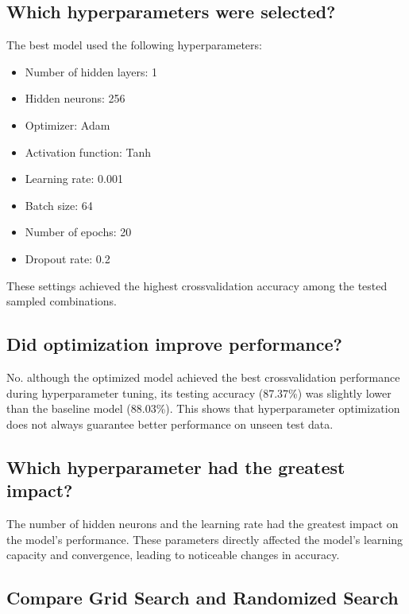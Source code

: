 \documentclass[11pt]{article}
\begin{document}
\subsection{Which hyperparameters were selected?}

The best model used the following hyperparameters:

\begin{itemize}
    \item Number of hidden layers: 1
    \item Hidden neurons: 256
    \item Optimizer: Adam
    \item Activation function: Tanh
    \item Learning rate: 0.001
    \item Batch size: 64
    \item Number of epochs: 20
    \item Dropout rate: 0.2
\end{itemize}

These settings achieved the highest crossvalidation accuracy among the tested sampled combinations.

\subsection{Did optimization improve performance?}

No. although the optimized model achieved the best crossvalidation performance during 
hyperparameter tuning, its testing accuracy (87.37\%) was slightly lower than the baseline 
model (88.03\%). This shows that hyperparameter optimization does not always guarantee 
better performance on unseen test data.

\subsection{Which hyperparameter had the greatest impact?}

The number of hidden neurons and the learning rate had the greatest impact on the model's 
performance. These parameters directly affected the model's learning capacity and 
convergence, leading to noticeable changes in accuracy.
\subsection{Compare Grid Search and Randomized Search}
\end{document}
